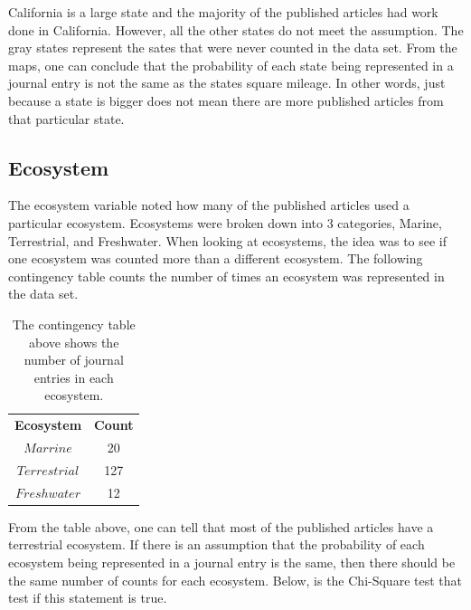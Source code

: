 \documentclass[12pt, letterpaper]{article}
\begin{document}
California is a large state and the majority of the published articles had work done in California. However, all the other states do not meet the assumption. The gray states represent the sates that were never counted in the data set. From the maps, one can conclude that the probability of each state being represented in a journal entry is not the same as the states square mileage. In other words, just because a state is bigger does not mean there are more published articles from that particular state.

\pagebreak

\subsection{Ecosystem}
The ecosystem variable noted how many of the published articles used a particular ecosystem. Ecosystems were broken down into 3 categories, Marine, Terrestrial, and Freshwater. When looking at ecosystems, the idea was to see if one ecosystem was counted more than a different ecosystem. The following contingency table counts the number of times an ecosystem was represented in the data set. 
\begin{table}[h]
\begin{center}
\begin{tabular}{|c|c|}
\textbf{Ecosystem} & \textbf{Count}\\
$Marrine$ & 20\\
$Terrestrial$ &  127\\
$Freshwater$ &  12\\
\end{tabular}
\end{center}
\label{fig: Ecosystem Contingency Table}
\caption{The contingency table above shows the number of journal entries in each ecosystem.}
\end{table}

From the table above, one can tell that most of the published articles have a terrestrial ecosystem. 
If there is an assumption that the probability of each ecosystem being represented in a journal entry is the same, then there should be the same number of counts for each ecosystem. Below, is the Chi-Square test that test if this statement is true. 
\end{document}
